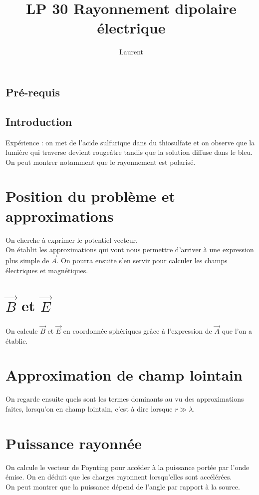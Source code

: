 \documentclass[12pt,prb,aps,epsf]{report}
\begin{document}
	
	\title{LP 30 Rayonnement dipolaire électrique}
	\author{Laurent}
	
	\maketitle
	
	\tableofcontents
	
	\pagebreak
	
	
\subsection{Pré-requis}


\subsection{Introduction}
Expérience : on met de l'acide sulfurique dans du thiosulfate et on observe que la lumière qui traverse devient rougeâtre tandis que la solution diffuse dans le bleu. On peut montrer notamment que le rayonnement est polarisé.

\section{Position du problème et approximations}
On cherche à exprimer le potentiel vecteur.\\
On établit les approximations qui vont nous permettre d'arriver à une expression plus simple de $\vec{A}$. On pourra ensuite s'en servir pour calculer les champs électriques et magnétiques.

\section{$\vec{B}$ et $\vec{E}$}

On calcule $\vec{B}$ et $\vec{E}$ en coordonnée sphériques grâce à l'expression de $\vec{A}$ que l'on a établie. 

\section{Approximation de champ lointain}
On regarde ensuite quels sont les termes dominants au vu des approximations faites, lorsqu'on en champ lointain, c'est à dire lorsque $r\gg\lambda$.

\section{Puissance rayonnée}
On calcule le vecteur de Poynting pour accéder à la puissance portée par l'onde émise.
On en déduit que les charges rayonnent lorsqu'elles sont accélérées.\\
On peut montrer que la puissance dépend de l'angle par rapport à la source.
\end{document}
